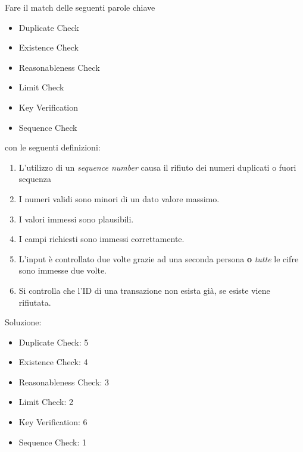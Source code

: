 \begin{Exercise} [
  title={Match definizioni},
  label={esCs7}
  ]

  \Question

  Fare il match delle seguenti parole chiave
  \begin{itemize}
   \item Duplicate Check
   \item Existence Check
   \item Reasonableness Check
   \item Limit Check
   \item Key Verification
   \item Sequence Check
  \end{itemize}

  con le seguenti definizioni:
  \begin{enumerate}
   \item L'utilizzo di un \textit{sequence number} causa il rifiuto
   dei numeri duplicati o fuori sequenza
   \item I numeri validi sono minori di un dato valore massimo.
   \item I valori immessi sono plausibili.
   \item I campi richiesti sono immessi correttamente.
   \item L'input è controllato due volte grazie ad una seconda persona
   \textbf{o} \emph{tutte} le cifre sono immesse due volte.
   \item Si controlla che l'ID di una transazione non esista già, se
   esiste viene rifiutata.
  \end{enumerate}

\end{Exercise}

\begin{Answer} [
  ref={esCs7},
  number={7}
  ]

  \Question Soluzione:
  \begin{itemize}
   \item Duplicate Check: 5
   \item Existence Check: 4
   \item Reasonableness Check: 3
   \item Limit Check: 2
   \item Key Verification: 6
   \item Sequence Check: 1
  \end{itemize}


\end{Answer}

